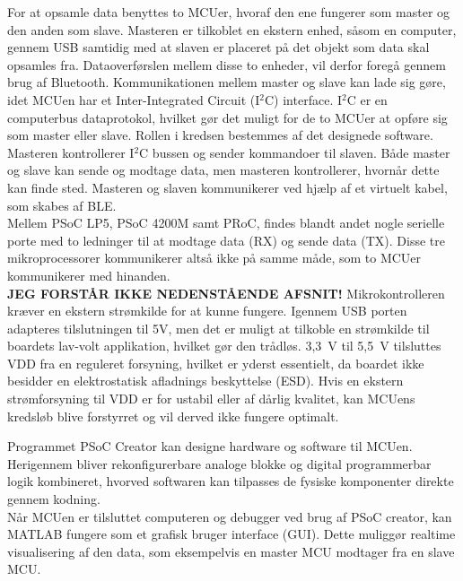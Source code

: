 For at opsamle data benyttes to MCUer, hvoraf den ene fungerer som master og den anden som slave. Masteren er tilkoblet en ekstern enhed, såsom en computer, gennem USB samtidig med at slaven er placeret på det objekt som data skal opsamles fra. Dataoverførslen mellem disse to enheder, vil derfor foregå gennem brug af Bluetooth. \newline
Kommunikationen mellem master og slave kan lade sig gøre, idet MCUen har et Inter-Integrated Circuit (I$^{2}$C) interface. I$^{2}$C er en computerbus dataprotokol, hvilket gør det muligt for de to MCUer at opføre sig som master eller slave. Rollen i kredsen bestemmes af det designede software. Masteren kontrollerer I$^{2}$C bussen og sender kommandoer til slaven. Både master og slave kan sende og modtage data, men masteren kontrollerer, hvornår dette kan finde sted. Masteren og slaven kommunikerer ved hjælp af et virtuelt kabel, som skabes af BLE. \citep{Semiconductor2016,Sparkfun2016}\\
Mellem PSoC LP5, PSoC 4200M samt PRoC, findes blandt andet nogle serielle porte med to ledninger til at modtage data (RX) og sende data (TX). Disse tre mikroprocessorer kommunikerer altså ikke på samme måde, som to MCUer kommunikerer med hinanden. \citep{Semiconductor2016} \\
\textbf{JEG FORSTÅR IKKE NEDENSTÅENDE AFSNIT!}\newline
Mikrokontrolleren kræver en ekstern strømkilde for at kunne fungere. Igennem USB porten adapteres tilslutningen til 5V, men det er muligt at tilkoble en strømkilde til boardets lav-volt applikation, hvilket gør den trådløs. 3,3~V til 5,5~V tilsluttes VDD fra en reguleret forsyning, hvilket er yderst essentielt, da boardet ikke besidder en elektrostatisk afladnings beskyttelse (ESD). Hvis en ekstern strømforsyning til VDD er for ustabil eller af dårlig kvalitet, kan MCUens kredsløb blive forstyrret og vil derved ikke fungere optimalt. \citep{Semiconductor2016}

Programmet PSoC Creator kan designe hardware og software til MCUen. Herigennem bliver rekonfigurerbare analoge blokke og digital programmerbar logik kombineret, hvorved softwaren kan tilpasses de fysiske komponenter direkte gennem kodning. \citep{Semiconductor2016} \\
Når MCUen er tilsluttet computeren og debugger ved brug af PSoC creator, kan MATLAB fungere som et grafisk bruger interface (GUI). Dette muliggør realtime visualisering af den data, som eksempelvis en master MCU modtager fra en slave MCU.\citep{Semiconductor2016,Sparkfun2016}

